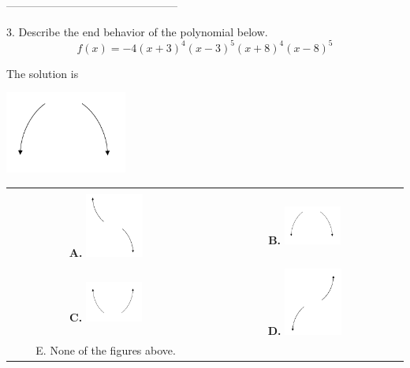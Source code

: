 \documentclass{extbook}[14pt]
\begin{document}
-----------------------------------------------

3. Describe the end behavior of the polynomial below.
\[ f(x) = -4(x + 3)^{4}(x - 3)^{5}(x + 8)^{4}(x - 8)^{5} \] 

 
 The solution is  
 \begin{center} \includegraphics[width=0.3\textwidth]{../Figures/polyEndBehaviorBB.png} \end{center}\begin{tabular}{|c|c|} 
\hline 
 & \tabularnewline 
 \textbf{A.} \includegraphics[width=0.3\textwidth]{../Figures/polyEndBehaviorAB.png} & \textbf{B.} \includegraphics[width=0.3\textwidth]{../Figures/polyEndBehaviorBB.png} \tabularnewline 
\hline 
 & \tabularnewline 
 \textbf{C.} \includegraphics[width=0.3\textwidth]{../Figures/polyEndBehaviorCB.png} & \textbf{D.} \includegraphics[width=0.3\textwidth]{../Figures/polyEndBehaviorDB.png} \tabularnewline 
\hline 
 E. None of the figures above. & \tabularnewline 
\hline 
 \end{tabular} 
 
\end{document}

